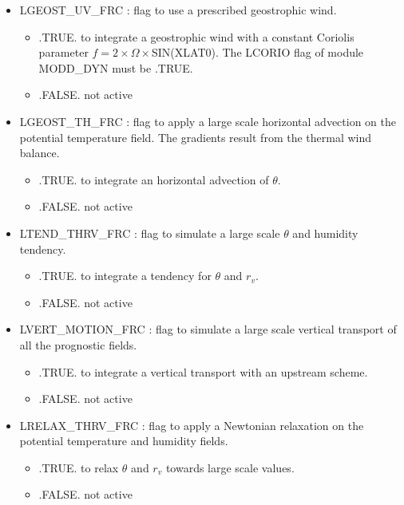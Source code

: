 \begin{itemize}
\item LGEOST\_UV\_FRC : flag to use a prescribed geostrophic wind.
\begin{itemize}
\item .TRUE.  to integrate a geostrophic wind with a constant Coriolis
parameter
$f=2 \times \Omega \times $SIN(XLAT0). The LCORIO flag of module MODD\_DYN
must be .TRUE.
\item .FALSE. not active
\end{itemize}

\item LGEOST\_TH\_FRC : flag to apply a large scale horizontal advection
on the potential temperature field. The gradients result from the thermal wind
balance.
\begin{itemize}
\item .TRUE.  to integrate an horizontal advection of $\theta$.
\item .FALSE. not active
\end{itemize}

\item LTEND\_THRV\_FRC : flag to simulate a large scale $\theta$ and
humidity tendency.
\begin{itemize}
\item .TRUE.  to integrate a tendency for $\theta$ and $r_v$.
\item .FALSE. not active
\end{itemize}

\item LVERT\_MOTION\_FRC : flag to simulate a large scale vertical transport
of all the prognostic fields.
\begin{itemize}
\item .TRUE.  to integrate a vertical transport with an upstream scheme.
\item .FALSE. not active
\end{itemize}

\item LRELAX\_THRV\_FRC : flag to apply a Newtonian relaxation on the
potential temperature and humidity fields.
\begin{itemize}
\item .TRUE.  to relax $\theta$ and $r_v$ towards large scale values.
\item .FALSE. not active
\end{itemize}


\end{itemize}
